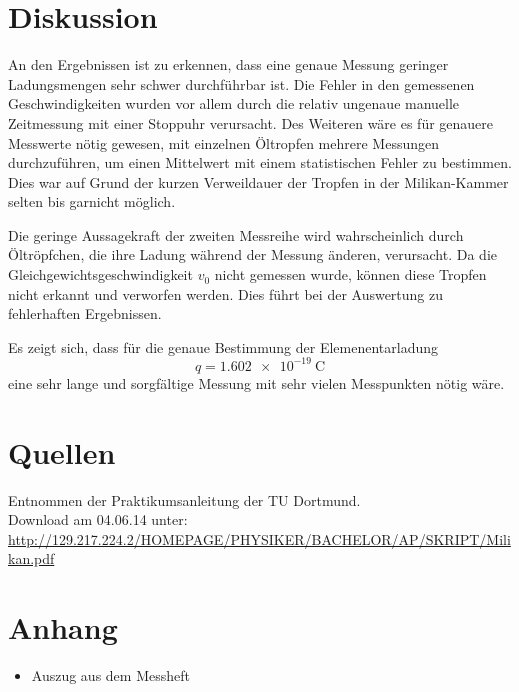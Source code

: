 \documentclass[11pt,ngerman,a4paper]{article}
\begin{document}
\section{Diskussion}
An den Ergebnissen ist zu erkennen, dass eine genaue Messung geringer Ladungsmengen sehr schwer durchführbar ist. Die Fehler in den gemessenen Geschwindigkeiten wurden vor allem durch die relativ ungenaue manuelle Zeitmessung mit einer Stoppuhr verursacht. Des Weiteren wäre es für genauere Messwerte nötig gewesen, mit einzelnen Öltropfen mehrere Messungen durchzuführen, um einen Mittelwert mit einem statistischen Fehler zu bestimmen. Dies war auf Grund der kurzen Verweildauer der Tropfen in der Milikan-Kammer selten bis garnicht möglich.

\noindent
Die geringe Aussagekraft der zweiten Messreihe wird wahrscheinlich durch Öltröpfchen, die ihre Ladung während der Messung änderen, verursacht. Da die Gleichgewichtsgeschwindigkeit $v_0$ nicht gemessen wurde, können diese Tropfen nicht erkannt und verworfen werden. Dies führt bei der Auswertung zu fehlerhaften Ergebnissen.

\noindent
Es zeigt sich, dass für die genaue Bestimmung der Elemenentarladung
\[
q = \SI{1.602e-19}{\coulomb}
\]
eine sehr lange und sorgfältige Messung mit sehr vielen Messpunkten nötig wäre.
\section{Quellen}
\begin{enumerate}[{[}1{]}]
\item Entnommen der Praktikumsanleitung \textit{} der TU Dortmund. \\
Download am 04.06.14 unter:\\
 \url{http://129.217.224.2/HOMEPAGE/PHYSIKER/BACHELOR/AP/SKRIPT/Milikan.pdf}
\end{enumerate}
\section{Anhang}
\begin{itemize}
\item Auszug aus dem Messheft
\end{itemize}
\end{document}
